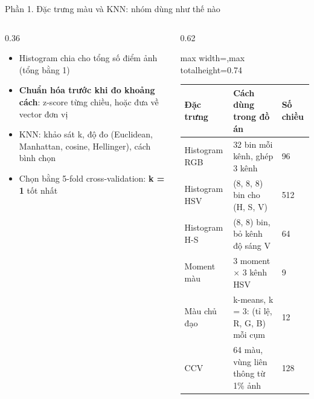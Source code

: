\documentclass[aspectratio=169,10pt]{beamer}
\begin{document}
\begin{frame}{Phần 1. Đặc trưng màu và KNN: nhóm dùng như thế nào}
\begin{columns}[T]
\begin{column}{0.36\textwidth}
\begin{itemize}\footnotesize
\item Histogram chia cho tổng số điểm ảnh (tổng bằng 1)
\item \textbf{Chuẩn hóa trước khi đo khoảng cách}: z-score từng chiều, hoặc đưa về vector đơn vị
\item KNN: khảo sát k, độ đo (Euclidean, Manhattan, cosine, Hellinger), cách bình chọn
\item Chọn bằng 5-fold cross-validation: \textbf{k = 1} tốt nhất
\end{itemize}
\end{column}
\begin{column}{0.62\textwidth}
\begin{center}\begin{adjustbox}{max width=\linewidth,max totalheight=0.74\textheight}
\begin{tabular}{lll}\toprule
\textbf{Đặc trưng} & \textbf{Cách dùng trong đồ án} & \textbf{Số chiều} \\ \midrule
Histogram RGB & 32 bin mỗi kênh, ghép 3 kênh & 96 \\
Histogram HSV & (8, 8, 8) bin cho (H, S, V) & 512 \\
Histogram H-S & (8, 8) bin, bỏ kênh độ sáng V & 64 \\
Moment màu & 3 moment $\times$ 3 kênh HSV & 9 \\
Màu chủ đạo & k-means, k = 3: (tỉ lệ, R, G, B) mỗi cụm & 12 \\
CCV & 64 màu, vùng liên thông từ 1\% ảnh & 128 \\
\bottomrule\end{tabular}
\end{adjustbox}\end{center}
\end{column}
\end{columns}
\end{frame}
\end{document}
